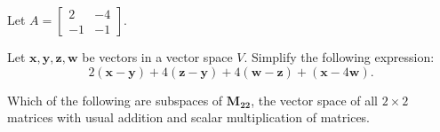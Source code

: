 \documentclass[addpoints, 12pt]{exam}%
\theoremstyle{definition}
\begin{document}
\begin{questions}

\question
Let $A = \begin{bmatrix} 2 & -4 \\ -1 & -1 \end{bmatrix}$.

\newpage 

\phantom{2}

\newpage

\question[10]

Let $\mathbf{x}, \mathbf{y}, \mathbf{z}, \mathbf{w}$ be vectors in a vector space $V$. Simplify the following expression: 
  $$
  2(\mathbf{x} - \mathbf{y}) + 4(\mathbf{z} - \mathbf{y}) + 4(\mathbf{w} - \mathbf{z}) + (\mathbf{x} - 4\mathbf{w}) .
  $$


\newpage 

\question

Which of the following are subspaces of $\mathbf{M_{22}}$, the vector space of all $2 \times 2$ matrices with usual addition and scalar multiplication of matrices.


\newpage 


\end{questions}
\end{document}
